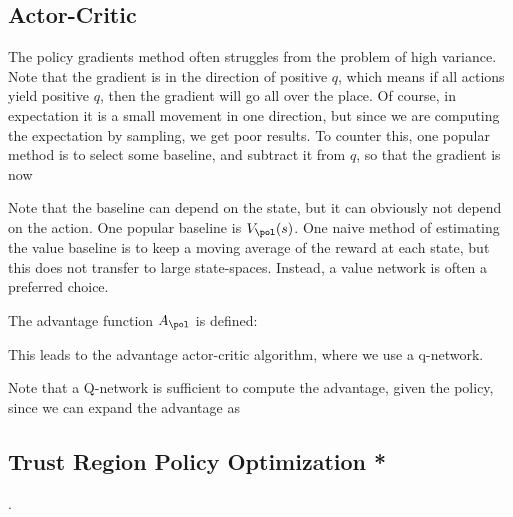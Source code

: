 \documentclass[12pt]{article}
\begin{document}
\subsection{Actor-Critic}

The policy gradients method often struggles from the problem of high variance. Note that the gradient is in the direction of positive $q$, which means if all actions yield positive $q$, then the gradient will go all over the place. Of course, in expectation it is a small movement in one direction, but since we are computing the expectation by sampling, we get poor results. To counter this, one popular method is to select some baseline, and subtract it from $q$, so that the gradient is now


Note that the baseline can depend on the state, but it can obviously not depend on the action. One popular baseline is $V_{\pol}(s)$. One naive method of estimating the value baseline is to keep a moving average of the reward at each state, but this does not transfer to large state-spaces. Instead, a value network is often a preferred choice.

The advantage function $A_{\pol}$ is defined:


This leads to the advantage actor-critic algorithm, where we use a q-network.


Note that a Q-network is sufficient to compute the advantage, given the policy, since we can expand the advantage as


\subsection{Trust Region Policy Optimization *}
.
\end{document}
